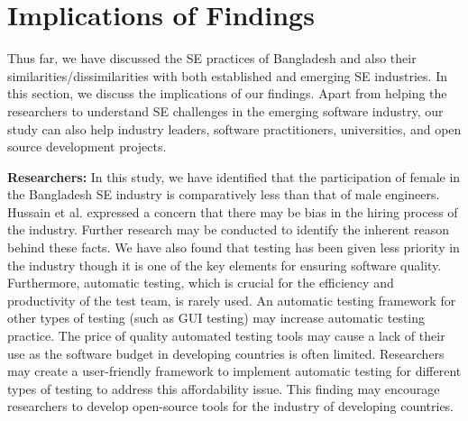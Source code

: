\section{Implications of Findings}


\label{implications}
Thus far, we have discussed the SE practices of Bangladesh and also their similarities/dissimilarities with both established and emerging SE industries. In this section, we discuss the implications of our findings. Apart from helping the researchers to understand SE challenges in the emerging software industry, our study can also help industry leaders, software practitioners, universities, and open source development projects.

\indent \textbf{Researchers:} In this study, we have identified that the participation of female in the Bangladesh SE industry is comparatively less than that of male engineers.  Hussain et al.\citep{Hussain2020} expressed a concern that there may be bias in the hiring process of the industry. Further research may be conducted to identify the inherent reason behind these facts. We have also found that testing has been given less priority in the industry though it is one of the key elements for ensuring software quality. Furthermore, automatic testing, which is crucial for the efficiency and productivity of the test team, is rarely used. An automatic testing framework for other types of testing (such as GUI testing) may increase automatic testing practice. The price of quality automated testing tools may cause a lack of their use as the software budget in developing countries is often limited. Researchers may create a user-friendly framework to implement automatic testing for different types of testing to address this affordability issue. This finding may encourage researchers to develop open-source tools for the industry of developing countries. 


